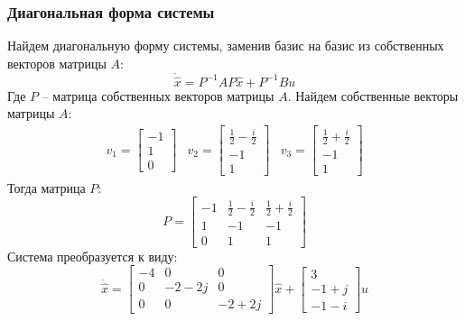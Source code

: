\subsubsection{Диагональная форма системы}
Найдем диагональную форму системы, заменив базис на базис из собственных векторов матрицы $A$:
\begin{equation}
    \dot{\hat{x}} = P^{-1}AP\hat{x} + P^{-1}Bu
\end{equation}
Где $P$ -- матрица собственных векторов матрицы $A$. 
Найдем собственные векторы матрицы $A$:
\begin{equation}
    \begin{array}{ccc}
        v_1 = \begin{bmatrix} -1 \\ 1 \\ 0 \end{bmatrix} &
        v_2 = \begin{bmatrix} \frac{1}{2} - \frac{i}{2} \\ -1 \\ 1 \end{bmatrix} &
        v_3 = \begin{bmatrix} \frac{1}{2} + \frac{i}{2} \\ -1 \\ 1 \end{bmatrix} 
    \end{array}
\end{equation}
Тогда матрица $P$:
\begin{equation}
    P = \begin{bmatrix}
        -1 & \frac{1}{2} - \frac{i}{2} & \frac{1}{2} + \frac{i}{2} \\
        1 & -1 & -1 \\
        0 & 1 & 1
    \end{bmatrix}
\end{equation}
Система преобразуется к виду:
\begin{equation}
    \dot{\hat{x}} = \begin{bmatrix}
        -4 & 0 & 0 \\
        0 & -2-2j & 0 \\
        0 & 0 & -2+2j
    \end{bmatrix} \hat{x} + 
    \begin{bmatrix}
        3 \\
        -1 + j \\ 
        -1 - i
    \end{bmatrix} u
\end{equation}

